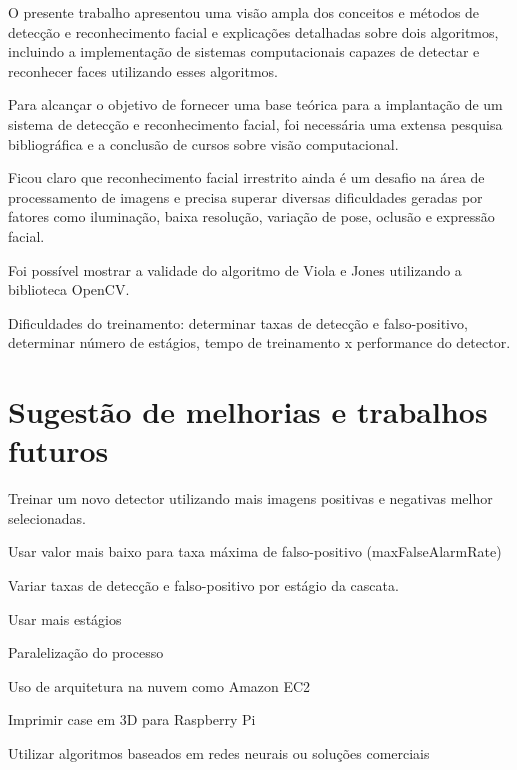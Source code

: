 
O presente trabalho apresentou uma visão ampla dos conceitos e métodos de detecção e reconhecimento facial e explicações detalhadas sobre dois algoritmos, incluindo a implementação de sistemas computacionais capazes de detectar e reconhecer faces utilizando esses algoritmos.

Para alcançar o objetivo de fornecer uma base teórica para a implantação de um sistema de detecção e reconhecimento facial, foi necessária uma extensa pesquisa bibliográfica e a conclusão de cursos sobre visão computacional.

Ficou claro que reconhecimento facial irrestrito ainda é um desafio na área de processamento de imagens e precisa superar diversas dificuldades geradas por fatores como iluminação, baixa resolução, variação de pose, oclusão e expressão facial.

Foi possível mostrar a validade do algoritmo de Viola e Jones utilizando a biblioteca OpenCV.

Dificuldades do treinamento: determinar taxas de detecção e falso-positivo, determinar número de estágios, tempo de treinamento x performance do detector.

\section{Sugestão de melhorias e trabalhos futuros}

Treinar um novo detector utilizando mais imagens positivas e negativas melhor selecionadas.

Usar valor mais baixo para taxa máxima de falso-positivo (maxFalseAlarmRate)

Variar taxas de detecção e falso-positivo por estágio da cascata.

Usar mais estágios

Paralelização do processo

Uso de arquitetura na nuvem como Amazon EC2

Imprimir case em 3D para Raspberry Pi

Utilizar algoritmos baseados em redes neurais ou soluções comerciais